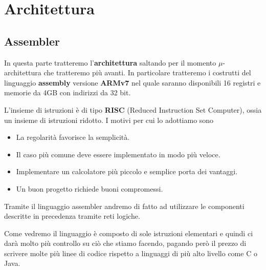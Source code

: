 \part{Architettura}

\chapter{Assembler}
In questa parte tratteremo l'\textbf{architettura} saltando per il momento $\mu$-architettura che
tratteremo più avanti. In particolare tratteremo i costrutti del linguaggio \textbf{assembly}
versione \textbf{ARMv7} nel quale saranno disponibili 16 registri e memorie da 4GB con indirizzi
da 32 bit.

L'insieme di istruzioni è di tipo \textbf{RISC} (Reduced Instruction Set Computer), ossia un
insieme di istruzioni ridotto. I motivi per cui lo adottiamo sono
\begin{itemize}
	\item La regolarità favorisce la semplicità.
	\item Il caso più comune deve essere implementato in modo più veloce.
	\item Implementare un calcolatore più piccolo e semplice porta dei vantaggi.
	\item Un buon progetto richiede buoni compromessi.
\end{itemize}
Tramite il linguaggio assembler andremo di fatto ad utilizzare le componenti descritte in
precedenza tramite reti logiche.

Come vedremo il linguaggio è composto di sole istruzioni elementari e quindi ci darà molto più
controllo su ciò che stiamo facendo, pagando però il prezzo di scrivere molte più linee di codice
rispetto a linguaggi di più alto livello come C o Java.

